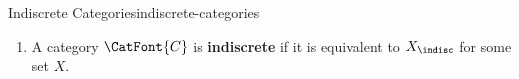 \begin{definition}{Indiscrete Categories}{indiscrete-categories}
\begin{enumerate}
\begin{itemize}
\[                        \circ^{X_{\indisc}}_{A,B,C}
                        \colon
                        \Hom_{X_{\indisc}}(B,C)
                        \times
                        \Hom_{X_{\indisc}}(A,B)
                        \to
                        \Hom_{X_{\indisc}}(A,C)
                    \]%
                    of $X_{\disc}$ at $(A,B,C)$ is defined by
                    \[
                        ([B]\to[C])\circ([A]\to[B])
                        \defeq
                        ([A]\to[C]).
                    \]%
            \end{itemize}
        \item\label{indiscrete-categories-indiscrete-categories}A category $\CatFont{C}$ is \textbf{indiscrete} if it is equivalent to $X_{\indisc}$ for some set $X$.
    \end{enumerate}
\end{definition}
